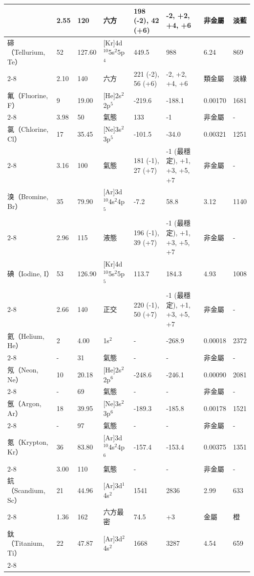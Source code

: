 \documentclass[a4paper,12pt]{report}
\begin{document}
\begin{longtable}[c]{|p{}|p{}|p{}|p{}|p{}|p{}|p{}|p{}|}
& 2.55 & 120 & 六方 & 198 (-2), 42 (+6) & -2, +2, +4, +6 & 非金屬 & 淡藍\\\hline
碲（Tellurium, Te） & 52 & 127.60 & [Kr]4d$^{10}$5s$^2$5p$^4$ & 449.5 & 988 & 6.24 & 869\\\cline{2-8}
& 2.10 & 140 & 六方 & 221 (-2), 56 (+6) & -2, +2, +4, +6 & 類金屬 & 淡綠\\\hline
氟（Fluorine, F） & 9 & 19.00 & [He]2s$^2$2p$^5$ & -219.6 & -188.1 & 0.00170 & 1681\\\cline{2-8}
& 3.98 & 50 & 氣態 & 133 & -1 & 非金屬 & -\\\hline
氯（Chlorine, Cl） & 17 & 35.45 & [Ne]3s$^2$3p$^5$ & -101.5 & -34.0 & 0.00321 & 1251\\\cline{2-8}
& 3.16 & 100 & 氣態 & 181 (-1), 27 (+7) & -1 (最穩定), +1, +3, +5, +7 & 非金屬 & -\\\hline
溴（Bromine, Br） & 35 & 79.90 & [Ar]3d$^{10}$4s$^2$4p$^5$ & -7.2 & 58.8 & 3.12 & 1140\\\cline{2-8}
& 2.96 & 115 & 液態 & 196 (-1), 39 (+7) & -1 (最穩定), +1, +3, +5, +7 & 非金屬 & -\\\hline
碘（Iodine, I） & 53 & 126.90 & [Kr]4d$^{10}$5s$^2$5p$^5$ & 113.7 & 184.3 & 4.93 & 1008\\\cline{2-8}
& 2.66 & 140 & 正交 & 220 (-1), 50 (+7) & -1 (最穩定), +1, +3, +5, +7 & 非金屬 & -\\\hline
氦（Helium, He） & 2 & 4.00 & 1s$^2$ & - & -268.9 & 0.00018 & 2372\\\cline{2-8}
& - & 31 & 氣態 & - & - & 非金屬 & -\\\hline
氖（Neon, Ne） & 10 & 20.18 & [He]2s$^2$2p$^6$ & -248.6 & -246.1 & 0.00090 & 2081\\\cline{2-8}
& - & 69 & 氣態 & - & - & 非金屬 & -\\\hline
氬（Argon, Ar） & 18 & 39.95 & [Ne]3s$^2$3p$^6$ & -189.3 & -185.8 & 0.00178 & 1521\\\cline{2-8}
& - & 97 & 氣態 & - & - & 非金屬 & -\\\hline
氪（Krypton, Kr） & 36 & 83.80 & [Ar]3d$^{10}$4s$^2$4p$^6$ & -157.4 & -153.4 & 0.00375 & 1351\\\cline{2-8}
& 3.00 & 110 & 氣態 & - & - & 非金屬 & -\\\hline
鈧（Scandium, Sc） & 21 & 44.96 & [Ar]3d$^1$4s$^2$ & 1541 & 2836 & 2.99 & 633\\\cline{2-8}
& 1.36 & 162 & 六方最密 & 74.5 & +3 & 金屬 & 橙\\\hline
鈦（Titanium, Ti） & 22 & 47.87 & [Ar]3d$^2$4s$^2$ & 1668 & 3287 & 4.54 & 659\\\cline{2-8}

\end{longtable}
\end{document}
